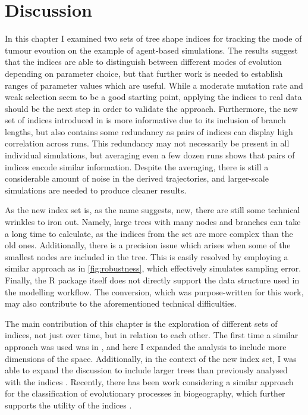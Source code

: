 \section{Discussion}
In this chapter I examined two sets of tree shape indices for tracking the mode
of tumour evoution on the example of agent-based simulations. The results
suggest that the indices are able to distinguish between different modes of
evolution depending on parameter choice, but that further work is needed to
establish ranges of parameter values which are useful. While a moderate
mutation rate and weak selection seem to be a good starting point, applying the
indices to real data should be the next step in order to validate the approach.
Furthermore, the new set of indices introduced in \cite{noble_new_2023} is more
informative due to its inclusion of branch lengths, but also
contains some redundancy as pairs of indices can display high correlation
across runs. This redundancy may not necessarily be present in all individual
simulations, but averaging even a few dozen runs shows that pairs of indices
encode similar information. Despite the averaging, there is still a
considerable amount of noise in the derived trajectories, and larger-scale
simulations are needed to produce cleaner results.\par
As the new index set is, as the name suggests, new, there are still some
technical wrinkles to iron out. Namely, large trees with many nodes and branches
can take a long time to calculate, as the indices from the set are more complex
than the old ones. Additionally, there is a precision issue which arises when
some of the smallest nodes are included in the tree. This is easily resolved by
employing a similar approach as in \ref{fig:robustness}, which effectively
simulates sampling error. Finally, the R package itself does not directly
support the data structure used in the modelling workflow. The conversion, which
was purpose-written for this work, may also contribute to the aforementioned
technical difficulties. \par

The main contribution of this chapter is the exploration of different sets of
indices, not just over time, but in relation to each other. The first time a
similar approach was used was in \cite{noble_spatial_2022}, and here I expanded
the analysis to include more dimensions of the space. Additionally, in the
context of the new index set, I was able to expand the discussion to include
larger trees than previously analysed with the indices \cite{noble_new_2023}.
Recently, there has been work considering a similar approach for the
classification of evolutionary processes in biogeography, which further supports
the utility of the indices \cite{freitas_patch_2024}. \par

